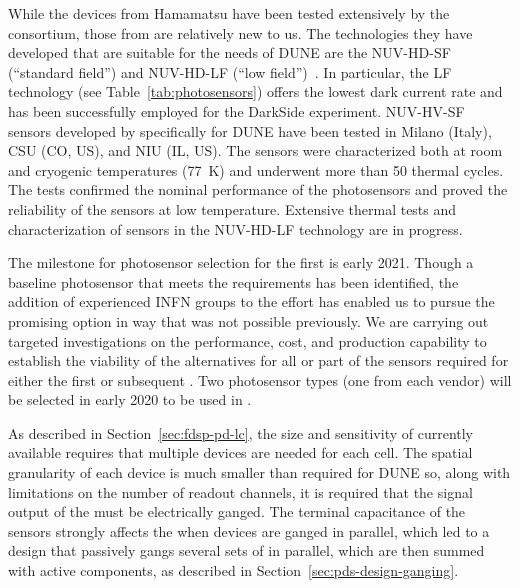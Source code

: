 
While the devices from Hamamatsu have been tested extensively by the consortium, those from  are relatively new to us. The technologies they have developed that are suitable for the needs of DUNE are the NUV-HD-SF (``standard field'') and NUV-HD-LF (``low field'')~\cite{Gola:2019idb}. In particular, the LF technology (see Table~\ref{tab:photosensors}) offers the lowest dark current rate and has been successfully employed for the DarkSide experiment. NUV-HV-SF sensors developed by  specifically for DUNE have been tested in Milano (Italy), CSU (CO, US), and NIU (IL, US). The sensors were characterized both at room and cryogenic temperatures (\SI{77}{K}) and underwent more than \num{50} thermal cycles. The tests confirmed the nominal performance of the photosensors and proved the reliability of the sensors at low temperature. Extensive thermal tests and characterization of sensors in the NUV-HD-LF technology are in progress.   


The milestone for photosensor selection for the first  is early 2021.  Though a baseline photosensor that meets the requirements has been identified, the addition of experienced INFN groups to the  effort has enabled us to pursue the promising  option in way that was not possible previously.  We are carrying out targeted investigations on the performance, cost, and production capability to establish the viability of the alternatives for all or part of the sensors required for either the first or subsequent . Two photosensor types (one from each vendor) will be selected in early 2020 to be used in .

As described in Section~\ref{sec:fdsp-pd-lc}, the size and sensitivity of currently available  requires that multiple devices are needed for each  cell. The spatial granularity of each device is much smaller than required for DUNE so,
along with limitations on the number of readout channels, it is required that the signal output of the  must be electrically ganged. The terminal capacitance of the sensors strongly affects the  when devices are ganged in parallel, which led to a design that passively gangs several sets of  in parallel, which are then summed with active components, as described in Section~\ref{sec:pds-design-ganging}.


